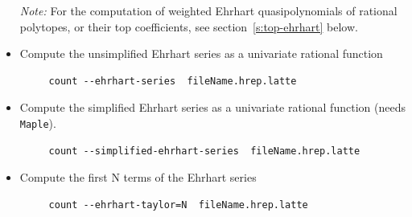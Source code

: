 \documentclass{article}
\newcommand{\maple}{{\tt Maple}\xspace}
\begin{document}
\begin{itemize}
  \emph{Note:}  For the computation of weighted Ehrhart quasipolynomials of rational
  polytopes, or their top coefficients, see section~\ref{s:top-ehrhart} below. 
\item Compute the unsimplified Ehrhart series as a univariate rational function
        \begin{verbatim}
     count --ehrhart-series  fileName.hrep.latte
        \end{verbatim} 
\item Compute the simplified Ehrhart series as a univariate rational function (needs \maple).
        \begin{verbatim}
     count --simplified-ehrhart-series  fileName.hrep.latte
        \end{verbatim} 
\item Compute the first N terms of the Ehrhart series
        \begin{verbatim}
     count --ehrhart-taylor=N  fileName.hrep.latte
        \end{verbatim} 
\end{itemize}
\end{document}
